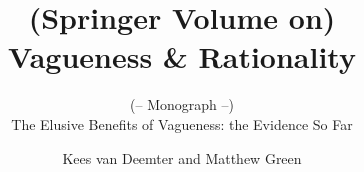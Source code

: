 \documentclass[graybox,envcountchap,sectrefs%
,footinfo
]{svmono}
\begin{document}
\author{Kees van Deemter and Matthew Green}
\title{(Springer Volume on)\\Vagueness \& Rationality}
\subtitle{(-- Monograph --)\\ The Elusive Benefits of Vagueness: the Evidence So Far}
\maketitle

\frontmatter%






\tableofcontents




\mainmatter%


%
%

\backmatter%

%
\printindex

\end{document}
